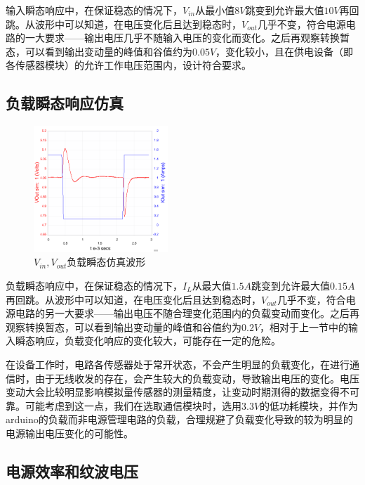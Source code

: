 \documentclass[a4paper, 11pt]{article} %
\begin{document}
输入瞬态响应中，在保证稳态的情况下，$V_{in}$从最小值$8V$跳变到允许最大值$10V$再回跳。从波形中可以知道，在电压变化后且达到稳态时，$V_{out}$几乎不变，符合电源电路的一大要求——输出电压几乎不随输入电压的变化而变化。之后再观察转换暂态，可以看到输出变动量的峰值和谷值约为$0.05V$，变化较小，且在供电设备（即各传感器模块）的允许工作电压范围内，设计符合要求。

\subsection{负载瞬态响应仿真}

\begin{figure}[H]
    \centering
    \includegraphics[width = 0.45\textwidth]{load_transient_sim.png}
    \caption{$V_{in}, V_{out}$负载瞬态仿真波形}
\end{figure}

负载瞬态响应中，在保证稳态的情况下，$I_L$从最大值$1.5A$跳变到允许最大值$0.15A$再回跳。从波形中可以知道，在电压变化后且达到稳态时，$V_{out}$几乎不变，符合电源电路的另一大要求——输出电压不随合理变化范围内的负载变动而变化。之后再观察转换暂态，可以看到输出变动量的峰值和谷值约为$0.2V$，相对于上一节中的输入瞬态响应，负载变化响应的变化较大，可能存在一定的危险。

在设备工作时，电路各传感器处于常开状态，不会产生明显的负载变化，在进行通信时，由于无线收发的存在，会产生较大的负载变动，导致输出电压的变化。电压变动大会比较明显影响模拟量传感器的测量精度，让变动时期测得的数据变得不可靠。可能考虑到这一点，我们在选取通信模块时，选用$3.3V$的低功耗模块，并作为arduino的负载而非电源管理电路的负载，合理规避了负载变化导致的较为明显的电源输出电压变化的可能性。

\subsection{电源效率和纹波电压}
\end{document}
